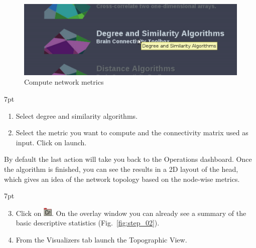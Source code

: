 \documentclass{tufte-handout}
\newenvironment{formal}{%
  \def\FrameCommand{%
    \hspace{1pt}%
    {\color{DarkBlue}\vrule width 2pt}%
    {\color{formalshade}\vrule width 4pt}%
    \colorbox{formalshade}%
  }%
  \MakeFramed{\advance\hsize-\width\FrameRestore}%
  \noindent\hspace{-4.55pt}%
  \begin{adjustwidth}{}{7pt}%
  \vspace{2pt}\vspace{2pt}%
}
{%
  \vspace{2pt}\end{adjustwidth}\endMakeFramed%
}
\begin{document}
\begin{figure}[h]
  \includegraphics[width=\linewidth]{Handout_UI_ModellingStructuralLesions_Analysis}%
  \caption{Compute network metrics}%
  \label{fig:step_01}%
\end{figure}

\begin{formal}
  \begin{enumerate}
  \item Select degree and similarity algorithms. 
  \item Select the metric you want to compute and the connectivity matrix used as input. Click on launch. 
  \end{enumerate}
\end{formal}


\noindent By default the last action will take you back to the Operations dashboard.
Once the algorithm is finished, you can see the results in a 2D layout of the
head, which gives an idea of the network topology based on the node-wise
metrics.

\begin{formal}
  \begin{enumerate}[resume]
  \setcounter{enumi}{2}
  \item Click on \includegraphics[width=0.042\linewidth]{nodeConnectivityMeasure}. On
  the overlay window you can already see a summary of the basic descriptive
  statistics (Fig.~\ref{fig:step_02}).

  \item From the Visualizers tab launch the Topographic View.
  \end{enumerate}
\end{formal}
\end{document}
